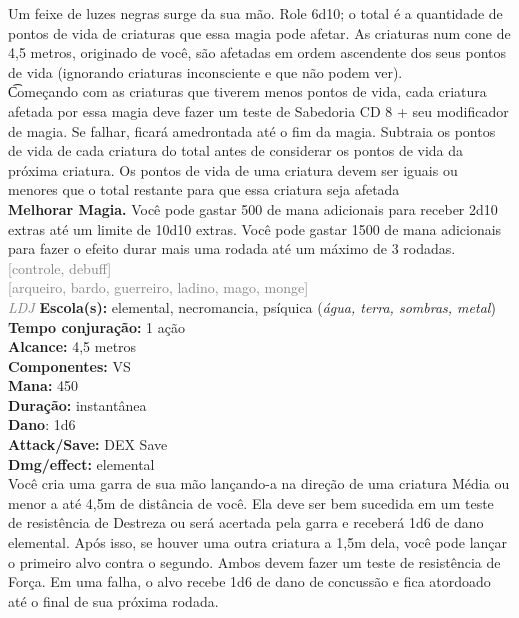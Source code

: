 \documentclass{RPG_Adventure}[2021/10/20]
\begin{document}
{\normalsize Um feixe de luzes negras surge da sua mão. Role 6d10; o total é a quantidade de pontos de vida de criaturas que essa magia pode afetar. As criaturas num cone de 4,5 metros, originado de você, são afetadas em ordem ascendente dos seus pontos de vida (ignorando criaturas inconsciente e que não podem ver).\\\t Começando com as criaturas que tiverem menos pontos de vida, cada criatura afetada por essa magia deve fazer um teste de Sabedoria CD 8 + seu modificador de magia. Se falhar, ficará amedrontada até o fim da magia. Subtraia os pontos de vida de cada criatura do total antes de considerar os pontos de vida da próxima criatura. Os pontos de vida de uma criatura devem ser iguais ou menores que o total restante para que essa criatura seja afetada\\\t \textbf{Melhorar Magia.} Você pode gastar 500 de mana adicionais para receber 2d10 extras até um limite de 10d10 extras. Você pode gastar 1500 de mana adicionais para fazer o efeito durar mais uma rodada até um máximo de 3 rodadas.\\}
{\scriptsize \textcolor{gray}{[controle, debuff]\\}}
{\scriptsize \textcolor{gray}{[arqueiro, bardo, guerreiro, ladino, mago, monge]\\}}
{\tiny \textcolor{gray}{\textit{LDJ}}}\jump{}
{\small \t \textbf{Escola(s):} elemental, necromancia, psíquica (\textit{água, terra, sombras, metal})\\\t \textbf{Tempo conjuração:} 1 ação\\\t \textbf{Alcance:} 4,5 metros\\\t \textbf{Componentes:} VS\\\t \textbf{Mana:} 450\\\t \textbf{Duração:} instantânea\\\t \textbf{Dano}: 1d6\\\t \textbf{Attack/Save:} DEX Save\\\t \textbf{Dmg/effect:} elemental\\}
{\normalsize Você cria uma garra de sua mão lançando-a na direção de uma criatura Média ou menor a até 4,5m de distância de você. Ela deve ser bem sucedida em um teste de resistência de Destreza ou será acertada pela garra e receberá 1d6 de dano elemental. Após isso, se houver uma outra criatura a 1,5m dela, você pode lançar o primeiro alvo contra o segundo. Ambos devem fazer um teste de resistência de Força. Em uma falha, o alvo recebe 1d6 de dano de concussão e fica atordoado até o final de sua próxima rodada.\\}
\end{document}
